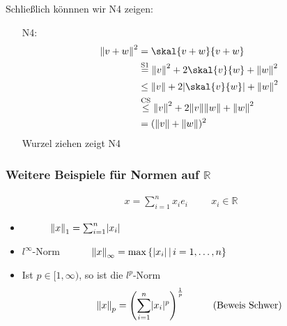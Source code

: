 Schließlich könnnen wir N4 zeigen:
\begin{enumerate}
	\item[N4:]\begin{align*}
		\norm{v+w}^2 &= \skal{v+w}{v+w} \\ 
		&\stackrel{\text{S1}}{=} \norm{v}^2+ 2 \skal{v}{w}+ \norm{w}^2 \\
		&\leq \norm{v} + 2 \abs{\skal{v}{w}}+ \norm{w}^2 \\
		&\stackrel{\text{CS}}{\leq} \norm{v}^2+2 \norm{v}\norm{w}+ \norm{w}^2 \\
		&=(\norm{v}+\norm{w})^2
	\end{align*} 
Wurzel ziehen zeigt N4
\bewende
\end{enumerate}

\subsubsection[Besipiele für Normen auf $\mathbb{R}$]{Weitere Beispiele für Normen auf $\mathbb{R}$} %
\label{ssub:weitere_beispiele_fur_normen_auf_mathbb_r}

\begin{gather*}
	 x = \sum^{n}_{i=1}x_ie_i \hspace{1cm}  x_i \in  \mathbb{R}
	 \end{gather*}
\begin{itemize}
	\item {} $\hspace{1cm}  \norm{x}_1 = \sum^{n}_{i=1}\abs{x_i}$ 
	\item $l^{\infty}$-Norm $\hspace{1cm} \norm{x}_{\infty}=\max{\{\abs{x_i}\,|\,i=1,\dots,n}\}$
	\item Ist $p \in [1,\infty)$, so ist die $l^p$-Norm
	\[
		\norm{x}_p = \left( \sum^{n}_{i=1}\abs{x_i}^p \right)^{\frac{1}{p}} \hspace{1cm} \text{(Beweis Schwer)}
	\] 
\end{itemize}

